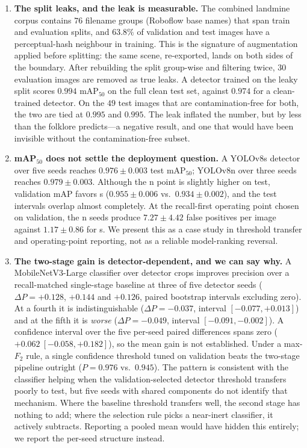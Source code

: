 \begin{enumerate}[leftmargin=1.2em,itemsep=2pt]
\item \textbf{The split leaks, and the leak is measurable.} The combined
landmine corpus contains $76$ filename groups (Roboflow base names) that span
train and evaluation splits, and $63.8\%$ of validation and test images have a
perceptual-hash neighbour in training. This is the signature of augmentation
applied before splitting: the same scene, re-exported, lands on both sides of the
boundary. After rebuilding the split group-wise and filtering twice, $30$
evaluation images are removed as true leaks. A detector trained on the leaky
split scores $0.994$ mAP$_{50}$ on the full clean test set, against $0.974$ for a
clean-trained detector. On the $49$ test images that are contamination-free for
both, the two are tied at $0.995$ and $0.995$. The leak inflated the number, but
by less than the folklore predicts---a negative result, and one that would have
been invisible without the contamination-free subset.

\item \textbf{mAP$_{50}$ does not settle the deployment question.} A YOLOv8s
detector over five seeds reaches $0.976 \pm 0.003$ test mAP$_{50}$; YOLOv8n over
three seeds reaches $0.979 \pm 0.003$. Although the n point is slightly higher
on test, validation mAP favors s ($0.955 \pm 0.006$ vs.\ $0.934 \pm 0.002$),
and the test intervals overlap almost completely. At the recall-first operating
point chosen on validation, the n seeds produce $7.27 \pm 4.42$ false positives
per image against $1.17 \pm 0.86$ for s. We present this as a case study in
threshold transfer and operating-point reporting, not as a reliable
model-ranking reversal.

\item \textbf{The two-stage gain is detector-dependent, and we can say why.} A
MobileNetV3-Large classifier over detector crops improves precision over a
recall-matched single-stage baseline at three of five detector seeds
($\Delta P = +0.128$, $+0.144$ and $+0.126$, paired bootstrap intervals
excluding zero). At a fourth it is indistinguishable
($\Delta P = -0.037$, interval $[-0.077, +0.013]$) and at the fifth it is
\emph{worse} ($\Delta P = -0.049$, interval $[-0.091, -0.002]$). A confidence
interval over the five per-seed paired differences spans zero
($+0.062\ [-0.058, +0.182]$), so the mean gain is not established. Under a
max-$F_2$ rule, a single confidence threshold tuned on validation beats the
two-stage pipeline outright ($P = 0.976$ vs.\ $0.945$). The pattern is consistent
with the classifier helping when the validation-selected detector threshold
transfers poorly to test, but five seeds with shared components do not identify
that mechanism. Where the baseline threshold transfers well, the second stage has
nothing to add; where the selection rule picks a near-inert classifier, it actively
subtracts. Reporting a pooled mean would have hidden this entirely; we report the
per-seed structure instead.


\end{enumerate}
